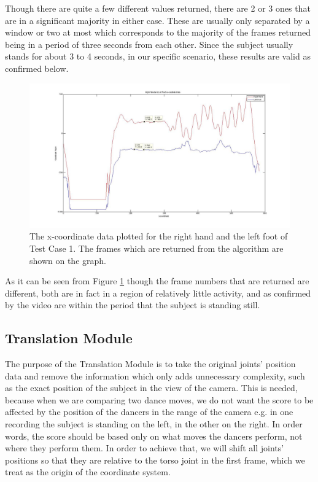 \documentclass[11pt,a4paper]{article}
\begin{document}
\noindent
Though there are quite a few different values returned, there are 2 or 3 ones that are in a significant majority in either case. These are usually only separated by a window or two at most which corresponds to the majority of the frames returned being in a period of three seconds from each other. Since the subject usually stands for about 3 to 4 seconds, in our specific scenario, these results are valid as confirmed below.

\begin{figure}[h]
\center
\includegraphics[scale=0.2]{Motionless_R_Hand_L_Foot_X.jpg} 
\caption{The x-coordinate data plotted for the right hand and the left foot of Test Case 1. The frames which are returned from the algorithm are shown on the graph.}
\label{motionless_rh_lf}
\end{figure}
 
\noindent
As it can be seen from Figure \ref{motionless_rh_lf} though the frame numbers that are returned are different, both are in fact in a region of relatively little activity, and as confirmed by the video are within the period that the subject is standing still. 

\clearpage
\subsection{Translation Module}
\noindent
The purpose of the Translation Module is to take the original joints' position data and remove the information which only adds unnecessary complexity, such as the exact position of the subject in the view of the camera. This is needed, because when we are comparing two dance moves, we do not want the score to be affected by the position of the dancers in the range of the camera e.g. in one recording the subject is standing on the left, in the other on the right. In order words, the score should be based only on what moves the dancers perform, not where they perform them. In order to achieve that, we will shift all joints' positions so that they are relative to the torso joint in the first frame, which we treat as the origin of the coordinate system.
\end{document}
